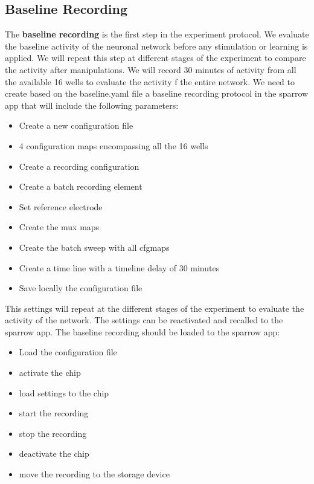 \documentclass{article}
\begin{document}
\subsection{Baseline Recording}
The \textbf{baseline recording} is the first step in the experiment protocol.
We evaluate the baseline activity of the neuronal network before any stimulation or learning is applied.
We will repeat this step at different stages of the experiment to compare the activity after manipulations.
We will record 30 minutes of activity from all the available 16 wells to evaluate the activity f the entire network.
We need to create based on the baseline.yaml file a baseline recording protocol in the sparrow app that will include the following parameters:
\begin{itemize}
    \item Create a new configuration file
    \item 4 configuration maps encompassing all the 16 wells
    \item Create a recording configuration
    \item Create a batch recording element
    \item Set reference electrode
    \item Create the mux maps
    \item Create the batch sweep with all cfgmaps
    \item Create a time line with a timeline delay of 30 minutes
    \item Save locally the configuration file
\end{itemize}
This settings will repeat at the different stages of the experiment to evaluate the activity of the network.
The settings can be reactivated and recalled to the sparrow app.
The baseline recording should be loaded to the sparrow app:
\begin{itemize}
    \item Load the configuration file
    \item activate the chip
    \item load settings to the chip
    \item start the recording
    \item stop the recording
    \item deactivate the chip
    \item move the recording to the storage device
\end{itemize}
\end{document}
